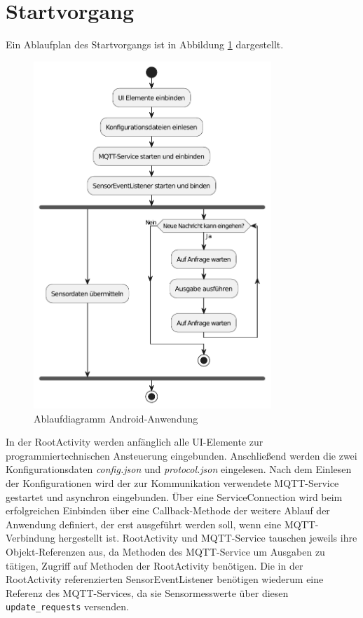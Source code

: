 \documentclass[11pt,a4paper]{report}
\begin{document}
\section{Startvorgang}
Ein Ablaufplan des Startvorgangs ist in Abbildung \ref{fig:app_flow} dargestellt.
\begin{figure}[htbp]
  \centering
  \includegraphics[width=0.8\textwidth]{images/app_ablauf}
  \caption{Ablaufdiagramm Android-Anwendung}
  \label{fig:app_flow}
\end{figure}
In der RootActivity werden anfänglich alle UI-Elemente zur programmiertechnischen Ansteuerung eingebunden.
Anschließend werden die zwei Konfigurationsdaten \textit{config.json} und \textit{protocol.json} eingelesen.
Nach dem Einlesen der Konfigurationen wird der zur Kommunikation verwendete MQTT-Service gestartet und asynchron eingebunden.
Über eine ServiceConnection wird beim erfolgreichen Einbinden über eine Callback-Methode der weitere Ablauf der Anwendung definiert, der erst ausgeführt werden soll, wenn eine MQTT-Verbindung hergestellt ist.
RootActivity und MQTT-Service tauschen jeweils ihre Objekt-Referenzen aus, da Methoden des MQTT-Service um Ausgaben zu tätigen, Zugriff auf  Methoden der RootActivity benötigen.
Die in der RootActivity referenzierten SensorEventListener benötigen wiederum eine Referenz des MQTT-Services, da sie Sensormesswerte über diesen \texttt{update\_requests} versenden.
\end{document}
